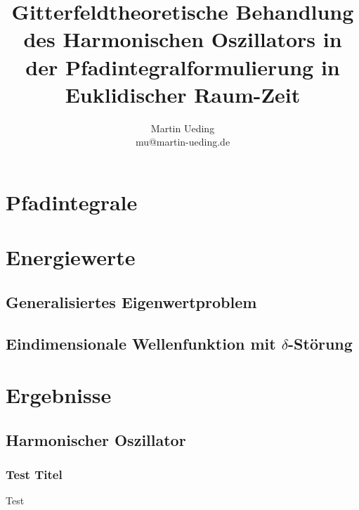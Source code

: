 \documentclass[11pt, ngerman, fleqn]{beamer}
\title{Gitterfeldtheoretische Behandlung des Harmonischen Oszillators in der Pfadintegralformulierung in Euklidischer Raum-Zeit}
\author{
    Martin Ueding \\ mu@martin-ueding.de
}
\begin{document}
\begin{frame}
    \titlepage
\end{frame}

\begin{frame}
    \tableofcontents
\end{frame}

\section{Pfadintegrale}

\section{Energiewerte}

\subsection{Generalisiertes Eigenwertproblem}

\subsection{Eindimensionale Wellenfunktion mit $\delta$-Störung}


\section{Ergebnisse}

\subsection{Harmonischer Oszillator}

\begin{frame}
    \frametitle{Test Titel}
   Test 
\end{frame}
\end{document}
